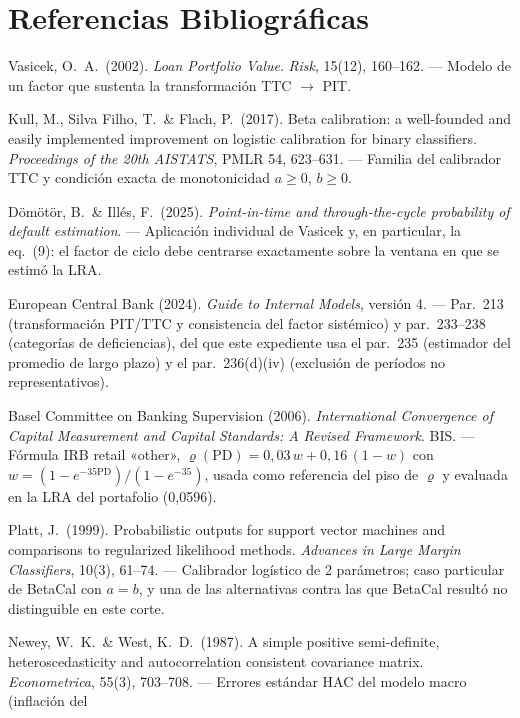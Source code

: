 \documentclass[12pt, a4paper]{article}
\newcommand{\PD}{\ensuremath{\mathrm{PD}}}
\renewcommand{\rho}{\ensuremath{\varrho}}
\begin{document}
\section{Referencias Bibliográficas}
\begin{enumerate}[label={[\arabic*]}]
  \item Vasicek, O.~A.\ (2002). \emph{Loan Portfolio Value}. \emph{Risk}, 15(12), 160--162.
    --- Modelo de un factor que sustenta la transformación TTC $\to$ PIT.
  \item Kull, M., Silva Filho, T.\ \& Flach, P.\ (2017). Beta calibration: a well-founded and
    easily implemented improvement on logistic calibration for binary classifiers.
    \emph{Proceedings of the 20th AISTATS}, PMLR 54, 623--631. --- Familia del calibrador TTC y
    condición exacta de monotonicidad $a\ge0$, $b\ge0$.
  \item Dömötör, B.\ \& Illés, F.\ (2025). \emph{Point-in-time and through-the-cycle probability of
    default estimation}. --- Aplicación individual de Vasicek y, en particular, la eq.~(9): el
    factor de ciclo debe centrarse exactamente sobre la ventana en que se estimó la LRA.
  \item European Central Bank (2024). \emph{Guide to Internal Models}, versión 4. --- Par.~213
    (transformación PIT/TTC y consistencia del factor sistémico) y par.~233--238 (categorías de
    deficiencias), del que este expediente usa el par.~235 (estimador del promedio de largo
    plazo) y el par.~236(d)(iv) (exclusión de períodos no representativos).
  \item Basel Committee on Banking Supervision (2006). \emph{International Convergence of Capital
    Measurement and Capital Standards: A Revised Framework}. BIS. --- Fórmula IRB retail «other»,
    $\rho(\PD)=0{,}03\,w+0{,}16\,(1-w)$ con $w=(1-e^{-35\PD})/(1-e^{-35})$, usada como referencia
    del piso de $\rho$ y evaluada en la LRA del portafolio (0,0596).
  \item Platt, J.\ (1999). Probabilistic outputs for support vector machines and comparisons to
    regularized likelihood methods. \emph{Advances in Large Margin Classifiers}, 10(3), 61--74.
    --- Calibrador logístico de 2 parámetros; caso particular de BetaCal con $a=b$, y una de las
    alternativas contra las que BetaCal resultó no distinguible en este corte.
  \item Newey, W.~K.\ \& West, K.~D.\ (1987). A simple positive semi-definite,
    heteroscedasticity and autocorrelation consistent covariance matrix.
    \emph{Econometrica}, 55(3), 703--708. --- Errores estándar HAC del modelo macro (inflación del

\end{enumerate}
\end{document}
